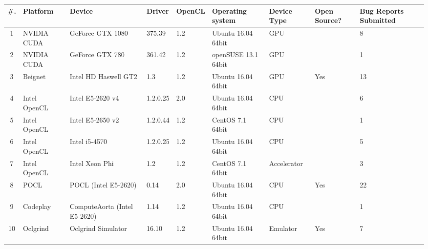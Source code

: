 \begin{tabular}{ cllllllL{1cm} | R{1.6cm} }
\toprule
\textbf{\#. } & \textbf{Platform} & \textbf{Device} & \textbf{Driver} & \textbf{OpenCL} & 
\textbf{Operating system} & \textbf{Device Type} & \textbf{Open Source?} & \textbf{Bug Reports Submitted} \\
 & NVIDIA CUDA & GeForce GTX 1080 & 375.39 & 1.2 & Ubuntu 16.04 64bit & GPU &  & 8 \\
2 & NVIDIA CUDA & GeForce GTX 780 & 361.42 & 1.2 & openSUSE  13.1 64bit & GPU &  &  1 \\
3 & Beignet & Intel HD Haswell GT2 & 1.3 & 1.2 & Ubuntu 16.04 64bit & GPU & Yes &  13 \\
4 & Intel OpenCL & Intel E5-2620 v4 & 1.2.0.25 & 2.0 & Ubuntu 16.04 64bit & CPU &  & 6 \\
5 & Intel OpenCL & Intel E5-2650 v2 & 1.2.0.44 & 1.2 & CentOS 7.1 64bit & CPU &  & 1 \\
6 & Intel OpenCL & Intel i5-4570 & 1.2.0.25 & 1.2 & Ubuntu 16.04 64bit & CPU &  & 5 \\
7 & Intel OpenCL & Intel Xeon Phi & 1.2 & 1.2 & CentOS 7.1 64bit & Accelerator &  & 3 \\
8 & POCL & POCL (Intel E5-2620) & 0.14 & 2.0 & Ubuntu 16.04 64bit & CPU & Yes & 22 \\
9 & Codeplay & ComputeAorta (Intel E5-2620) & 1.14 & 1.2 & Ubuntu 16.04 64bit & CPU &  & 1 \\
10 & Oclgrind & Oclgrind Simulator & 16.10 & 1.2 & Ubuntu 16.04 64bit & Emulator & Yes & 7 \\

\bottomrule
\end{tabular}

